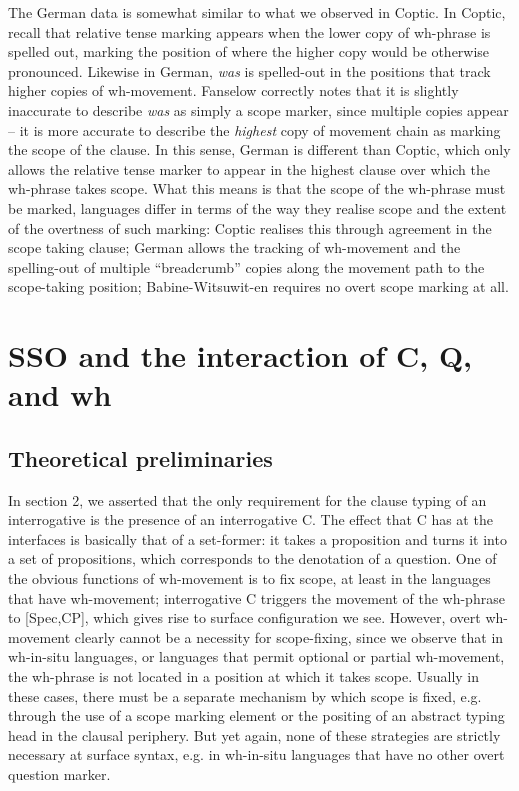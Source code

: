 \documentclass[charis]{glossa}
\begin{document}
The German data is somewhat similar to what we observed in Coptic. In Coptic, recall that relative tense marking appears when the lower copy of wh-phrase is spelled out, marking the position of where the higher copy would be otherwise pronounced. Likewise in German, \textit{was} is spelled-out in the positions that track higher copies of wh-movement. Fanselow correctly notes that it is slightly inaccurate to describe \textit{was} as simply a scope marker, since multiple copies appear -- it is more accurate to describe the \textit{highest} copy of movement chain as marking the scope of the clause. In this sense, German is different than Coptic, which only allows the relative tense marker to appear in the highest clause over which the wh-phrase takes scope. What this means is that the scope of the wh-phrase must be marked, languages differ in terms of the way they realise scope and the extent of the overtness of such marking: Coptic realises this through agreement in the scope taking clause; German allows the tracking of wh-movement and the spelling-out of multiple ``breadcrumb'' copies along the movement path to the scope-taking position; Babine-Witsuwit-en requires no overt scope marking at all.

\section{SSO and the interaction of C, Q, and wh}
\subsection{Theoretical preliminaries}
In section 2, we asserted that the only requirement for the clause typing of an interrogative is the presence of an interrogative C. The effect that C has at the interfaces is basically that of a set-former: it takes a proposition and turns it into a set of propositions, which corresponds to the denotation of a question. One of the obvious functions of wh-movement is to fix scope, at least in the languages that have wh-movement; interrogative C triggers the movement of the wh-phrase to [Spec,CP], which gives rise to surface configuration we see. However, overt wh-movement clearly cannot be a necessity for scope-fixing, since we observe that in wh-in-situ languages, or languages that permit optional or partial wh-movement, the wh-phrase is not located in a position at which it takes scope. Usually in these cases, there must be a separate mechanism by which scope is fixed, e.g. through the use of a scope marking element or the positing of an abstract typing head in the clausal periphery. But yet again, none of these strategies are strictly necessary at surface syntax, e.g. in wh-in-situ languages that have no other overt question marker.
\end{document}
